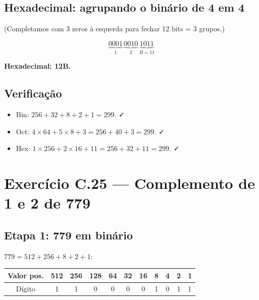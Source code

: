 \documentclass[11pt,a4paper]{article}
\begin{document}
\subsection*{Hexadecimal: agrupando o bin\'ario de 4 em 4}

(Completamos com 3 zeros \`a esquerda para fechar 12 bits = 3 grupos.)

\[
\underbrace{0001}_{1} \, \underbrace{0010}_{2} \, \underbrace{1011}_{B=11}
\]

\begin{resposta}\textbf{Hexadecimal: 12B.}\end{resposta}

\subsection*{Verifica\c{c}\~ao}

\begin{itemize}[leftmargin=*,itemsep=0pt]
  \item Bin: $256+32+8+2+1 = 299$. ✓
  \item Oct: $4 \times 64 + 5 \times 8 + 3 = 256+40+3 = 299$. ✓
  \item Hex: $1 \times 256 + 2 \times 16 + 11 = 256+32+11 = 299$. ✓
\end{itemize}

\newpage
\section{Exerc\'icio C.25 --- Complemento de 1 e 2 de 779}

\subsection*{Etapa 1: 779 em bin\'ario}

$779 = 512 + 256 + 8 + 2 + 1$:

\begin{center}
\renewcommand{\arraystretch}{1.2}
\begin{tabular}{|c|c|c|c|c|c|c|c|c|c|}
\hline
Valor pos. & 512 & 256 & 128 & 64 & 32 & 16 & 8 & 4 & 2 & 1 \\
\hline
D\'igito    & 1   & 1   & 0   & 0  & 0  & 0  & 1 & 0 & 1 & 1 \\
\hline
\end{tabular}
\end{center}
\end{document}
